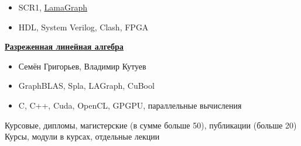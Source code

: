 \documentclass[xcolor=table,aspectratio=169]{beamer}
\begin{document}
\begin{frame}[fragile]
\begin{minipage}{0.48\textwidth}
{\begin{itemize}
          \item SCR1, \href{https://github.com/Lamagraph}{LamaGraph}
          \item HDL, System Verilog, Clash, FPGA
        \end{itemize}
        }
        \underline{\textbf{\href{https://github.com/SparseLinearAlgebra}{Разреженная линейная алгебра}}}
        \small{
        \begin{itemize}\setlength\itemsep{-0.4em}
          \item Семён Григорьев, Владимир Кутуев
          \item GraphBLAS, Spla, LAGraph, CuBool
          \item C, C++, Cuda, OpenCL, GPGPU, параллельные вычисления
        \end{itemize}
        }      
    \end{minipage}
    \noindent\makebox[\linewidth]{\rule{\paperwidth}{0.4pt}}
    \begin{center}
      Курсовые, дипломы, магистерские (в сумме больше 50), публикации (больше 20) \\
      Курсы, модули в курсах, отдельные лекции
    \end{center}
\end{frame}
\end{document}
